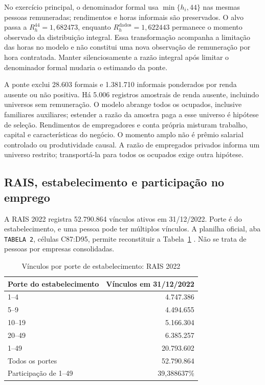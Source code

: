 No exercício principal, o denominador formal usa $\min\{h_i,44\}$ nas mesmas pessoas remuneradas; rendimentos e horas informais são preservados. O alvo passa a $R_h^{44}=1{,}682473$, enquanto $R_h^{\mathrm{dados}}=1{,}622443$ permanece o momento observado da distribuição integral. Essa transformação acompanha a limitação das horas no modelo e não constitui uma nova observação de remuneração por hora contratada. Manter silenciosamente a razão integral após limitar o denominador formal mudaria o estimando da ponte.

A ponte exclui 28.603 formais e 1.381.710 informais ponderados por renda ausente ou não positiva. Há 5.006 registros amostrais de renda ausente, incluindo universos sem remuneração. O modelo abrange todos os ocupados, inclusive familiares auxiliares; estender a razão da amostra paga a esse universo é hipótese de seleção. Rendimentos de empregadores e conta própria misturam trabalho, capital e características do negócio. O momento amplo não é prêmio salarial controlado ou produtividade causal. A razão de empregados privados informa um universo restrito; transportá-la para todos os ocupados exige outra hipótese.

\subsection{RAIS, estabelecimento e participação no emprego}
A RAIS 2022 registra 52.790.864 vínculos ativos em 31/12/2022. Porte é do estabelecimento, e uma pessoa pode ter múltiplos vínculos. A planilha oficial, aba \texttt{TABELA 2}, células C87:D95, permite reconstituir a Tabela~\ref{tab:app_rais} \citep{RAIS2022TabelasVerificadas}. Não se trata de pessoas por empresas consolidadas.
\begin{table}[htbp]
\centering
\caption{Vínculos por porte de estabelecimento: RAIS 2022}
\label{tab:app_rais}
\normalsize
\begin{tabular}{@{}lr@{}}
\toprule
Porte do estabelecimento & Vínculos em 31/12/2022 \\
\midrule
1--4 & 4.747.386 \\
5--9 & 4.494.655 \\
10--19 & 5.166.304 \\
20--49 & 6.385.257 \\
\midrule
1--49 & 20.793.602 \\
Todos os portes & 52.790.864 \\
Participação de 1--49 & 39,388637\% \\
\bottomrule
\end{tabular}
\end{table}

